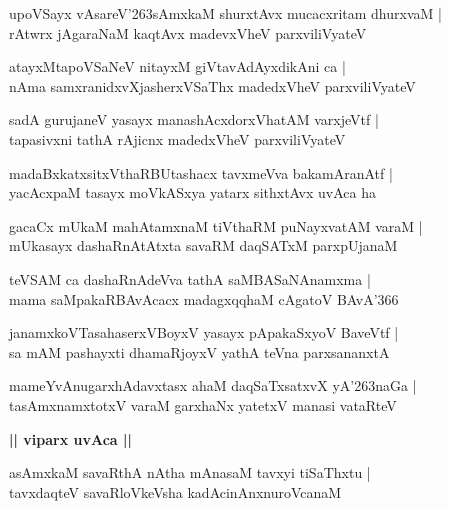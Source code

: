 \documentclass[twoside,12pt,openright]{book}
\def\S{\char'263}
\newcounter{shloka}[chapter]
\def\uvaca#1{\centerline{{\large\textbf{#1}}}}
\begin{document}
\begin{shloka}%
upoVSayx vAsareV\S sAmxkaM shurxtAvx mucacxritam dhurxvaM |\\
rAtwrx jAgaraNaM kaqtAvx madevxVheV parxviliVyateV 
\end{shloka}

\begin{shloka}%
atayxMtapoVSaNeV nitayxM giVtavAdAyxdikAni ca |\\
nAma samxranidxvXjasherxVSaThx madedxVheV parxviliVyateV 
\end{shloka}

\begin{shloka}%
sadA gurujaneV yasayx manashAcxdorxVhatAM varxjeVtf |\\
tapasivxni tathA rAjicnx madedxVheV parxviliVyateV 
\end{shloka}

\begin{shloka}%
madaBxkatxsitxVthaRBUtashacx tavxmeVva bakamAranAtf |\\
yacAcxpaM tasayx moVkASxya yatarx sithxtAvx uvAca ha 
\end{shloka}

\begin{shloka}%
gacaCx mUkaM mahAtamxnaM tiVthaRM puNayxvatAM varaM |\\
mUkasayx dashaRnAtAtxta savaRM daqSATxM parxpUjanaM 
\end{shloka}

\begin{shloka}%
teVSAM ca dashaRnAdeVva tathA saMBASaNAnamxma |\\
mama saMpakaRBAvAcacx madagxqqhaM cAgatoV BAvA\char'366
\end{shloka}

\begin{shloka}%
janamxkoVTasahaserxVBoyxV yasayx pApakaSxyoV BaveVtf |\\
sa mAM pashayxti dhamaRjoyxV yathA teVna parxsananxtA 
\end{shloka}

\begin{shloka}%
mameYvAnugarxhAdavxtasx ahaM daqSaTxsatxvX yA\S naGa |\\
tasAmxnamxtotxV varaM garxhaNx yatetxV manasi vataRteV 
\end{shloka}

\uvaca{|| viparx uvAca ||}

\begin{shloka}%
asAmxkaM savaRthA nAtha mAnasaM tavxyi tiSaThxtu |\\
tavxdaqteV savaRloVkeVsha kadAcinAnxnuroVcanaM 
\end{shloka}
\end{document}
